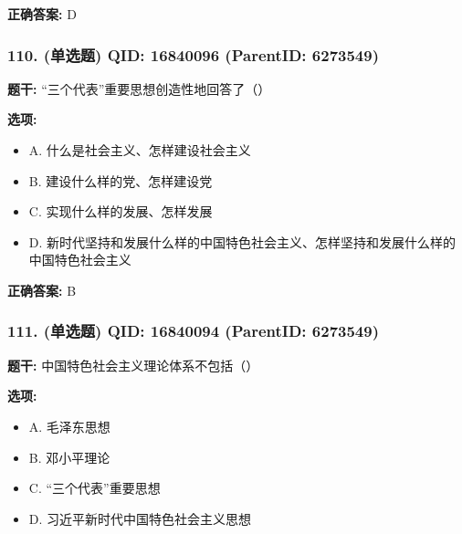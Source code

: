 \documentclass[12pt,UTF8]{ctexart}
\begin{document}
\textbf{正确答案:}
D

\vspace{0.3em}\hrulefill\vspace{0.7em}

\subsubsection*{110. (单选题) \small QID: 16840096 (ParentID: 6273549)}

\textbf{题干:}
“三个代表”重要思想创造性地回答了（）



\textbf{选项:}
\begin{itemize}[leftmargin=*]

  \item A. 什么是社会主义、怎样建设社会主义

  \item B. 建设什么样的党、怎样建设党

  \item C. 实现什么样的发展、怎样发展

  \item D. 新时代坚持和发展什么样的中国特色社会主义、怎样坚持和发展什么样的中国特色社会主义

\end{itemize}

\textbf{正确答案:}
B

\vspace{0.3em}\hrulefill\vspace{0.7em}

\subsubsection*{111. (单选题) \small QID: 16840094 (ParentID: 6273549)}

\textbf{题干:}
中国特色社会主义理论体系不包括（）



\textbf{选项:}
\begin{itemize}[leftmargin=*]

  \item A. 毛泽东思想

  \item B. 邓小平理论

  \item C. “三个代表”重要思想

  \item D. 习近平新时代中国特色社会主义思想

\end{itemize}
\end{document}
